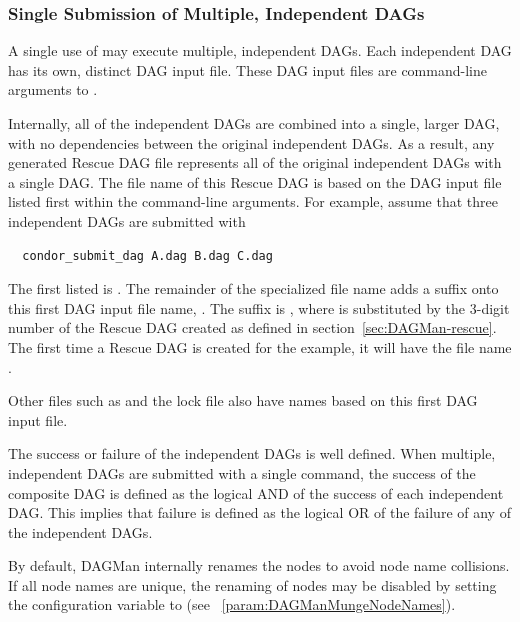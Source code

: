 \subsubsection{\label{sec:MultipleDAGs}Single Submission of Multiple, Independent DAGs}

A single use of  may execute multiple, independent DAGs.
Each independent DAG has its own, distinct DAG input file.
These DAG input files are command-line arguments to
.

Internally, all of the independent DAGs are combined
into a single, larger DAG, with no dependencies between
the original independent DAGs.
As a result,
any generated Rescue DAG file represents all of the original independent DAGs
with a single DAG.
The file name of this Rescue DAG is based on the DAG input file
listed first within the command-line arguments.
For example, assume that three independent DAGs are submitted with
\begin{verbatim}
  condor_submit_dag A.dag B.dag C.dag
\end{verbatim}
The first listed is .
The remainder of the specialized file name adds a suffix
onto this first DAG input file name, .
The suffix is ,
where  is substituted by the 3-digit number of the
Rescue DAG created as defined in section~\ref{sec:DAGMan-rescue}.
The first time a Rescue DAG is created for the example,
it will have the file name .

Other files such
as  and the lock file also have names based on this
first DAG input file.

The success or failure of the independent DAGs is well defined.
When multiple, independent DAGs are submitted with a single
command, the
success of the composite DAG is defined as the logical AND
of the success of each independent DAG.
This implies that failure is defined as the logical OR
of the failure of any of the independent DAGs.

By default, DAGMan internally renames the nodes to avoid node name collisions.  
If all node names are unique, 
the renaming of nodes may be disabled by
setting the configuration variable 
to  (see ~\ref{param:DAGManMungeNodeNames}).


